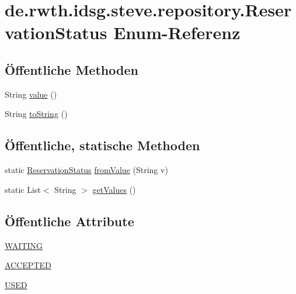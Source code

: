 \hypertarget{enumde_1_1rwth_1_1idsg_1_1steve_1_1repository_1_1_reservation_status}{\section{de.\+rwth.\+idsg.\+steve.\+repository.\+Reservation\+Status Enum-\/\+Referenz}
\label{enumde_1_1rwth_1_1idsg_1_1steve_1_1repository_1_1_reservation_status}
}
\subsection*{Öffentliche Methoden}
\begin{DoxyCompactItemize}
\item 
String \hyperlink{enumde_1_1rwth_1_1idsg_1_1steve_1_1repository_1_1_reservation_status_a0661b2411dc0a7d06f2e73a42288ce36}{value} ()
\item 
String \hyperlink{enumde_1_1rwth_1_1idsg_1_1steve_1_1repository_1_1_reservation_status_a265349685cbf5f8e387ed72d6c7ee8f0}{to\+String} ()
\end{DoxyCompactItemize}
\subsection*{Öffentliche, statische Methoden}
\begin{DoxyCompactItemize}
\item 
static \hyperlink{enumde_1_1rwth_1_1idsg_1_1steve_1_1repository_1_1_reservation_status}{Reservation\+Status} \hyperlink{enumde_1_1rwth_1_1idsg_1_1steve_1_1repository_1_1_reservation_status_a200aecca7ea0a5b82bb90c2359e98759}{from\+Value} (String v)
\item 
static List$<$ String $>$ \hyperlink{enumde_1_1rwth_1_1idsg_1_1steve_1_1repository_1_1_reservation_status_a3e2dc86a6adcf2705375945854bf3b2b}{get\+Values} ()
\end{DoxyCompactItemize}
\subsection*{Öffentliche Attribute}
\begin{DoxyCompactItemize}
\item 
\hyperlink{enumde_1_1rwth_1_1idsg_1_1steve_1_1repository_1_1_reservation_status_a8e53c1b90c78fe4502e0773ef54db906}{W\+A\+I\+T\+I\+N\+G}
\item 
\hyperlink{enumde_1_1rwth_1_1idsg_1_1steve_1_1repository_1_1_reservation_status_a57d4572a09ac1208ff3f9043388d99c3}{A\+C\+C\+E\+P\+T\+E\+D}
\item 
\hyperlink{enumde_1_1rwth_1_1idsg_1_1steve_1_1repository_1_1_reservation_status_a6b1991b30f8328e3ba9bc2e1711b1ca9}{U\+S\+E\+D}
\end{DoxyCompactItemize}


